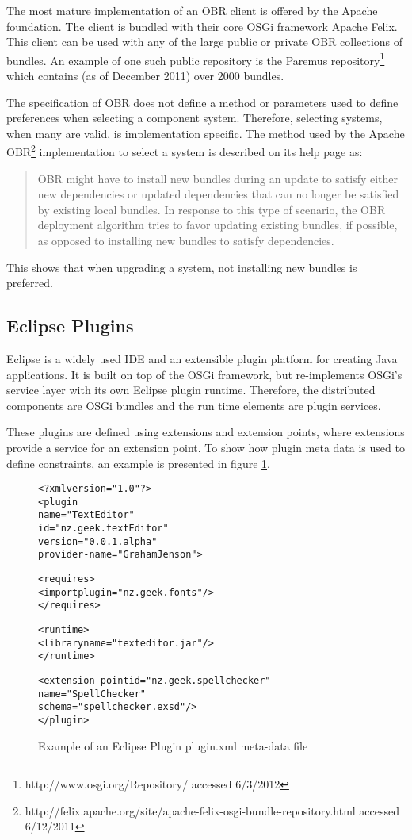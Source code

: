 The most mature implementation of an OBR client is offered by the Apache foundation.
The client is bundled with their core OSGi framework Apache Felix. 
This client can be used with any of the large public or private OBR collections of bundles.
An example of one such public repository is the Paremus repository\footnote{http://www.osgi.org/Repository/ accessed 6/3/2012} which contains (as of December 2011) over 2000 bundles.

The specification of OBR does not define a method or parameters used to define preferences when selecting a component system.
Therefore, selecting systems, when many are valid, is implementation specific.
The method used by the Apache OBR\footnote{http://felix.apache.org/site/apache-felix-osgi-bundle-repository.html accessed 6/12/2011} implementation 
to select a system is described on its help page as:

\begin{quotation}
OBR might have to install new bundles during an update to satisfy either new dependencies or updated dependencies that can no longer be satisfied by existing local bundles. 
In response to this type of scenario, the OBR deployment algorithm tries to favor updating existing bundles, if possible, as opposed to installing new bundles to satisfy dependencies.
\end{quotation}

This shows that when upgrading a system, not installing new bundles is preferred.

\subsection{Eclipse Plugins}
Eclipse is a widely used IDE and an extensible plugin platform for creating Java applications.
It is built on top of the OSGi framework, but re-implements OSGi's service layer with its own Eclipse plugin runtime.
Therefore, the distributed components are OSGi bundles and the run time elements are plugin services.

These plugins are defined using extensions and extension points, where extensions provide a service for an extension point.
To show how plugin meta data is used to define constraints, an example is presented in figure \ref{eclipseplugin}. 

\begin{figure}[htp]
\begin{center}
\begin{alltt}
<?xml version="1.0"?>
<plugin
    name="Text Editor"
    id="nz.geek.textEditor"
    version="0.0.1.alpha"
    provider-name="Graham Jenson">
    
    <requires>
        <import plugin="nz.geek.fonts"/>
    </requires>

    <runtime>
        <library name="texteditor.jar"/>
    </runtime>
    
    <extension-point id="nz.geek.spellchecker" 
        name="Spell Checker" 
        schema="spellchecker.exsd"/>
</plugin>
\end{alltt}
  \caption{Example of an Eclipse Plugin plugin.xml meta-data file}
  \label{eclipseplugin}
\end{center}
\end{figure}

